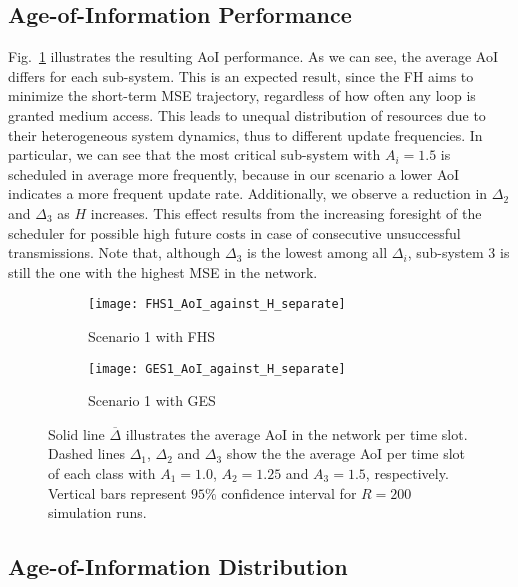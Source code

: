 \subsection{Age-of-Information Performance}

Fig.~\ref{fig:AoIseperate} illustrates the resulting AoI performance. As we can
see, the average AoI differs for each sub-system. This is an expected result,
since the FH aims to minimize the short-term MSE trajectory, regardless of how
often any loop is granted medium access. This leads to unequal distribution of
resources due to their heterogeneous system dynamics, thus to different update
frequencies. In particular, we can see that the most critical sub-system with
$A_i = 1.5$ is scheduled in average more frequently, because in our scenario a
lower AoI indicates a more frequent update rate. Additionally, we observe a
reduction in $\Delta_2$ and $\Delta_3$ as $H$ increases. This effect results
from the increasing foresight of the scheduler for possible high future costs in
case of consecutive unsuccessful transmissions. Note that, although $\Delta_3$
is the lowest among all $\Delta_i$, sub-system $3$ is still the one with the
highest MSE in the network.

\begin{figure}[htbp]
  \centering
  \begin{subfigure}[b]{0.49\textwidth}
      \centering
      \texttt{[image: FHS1\_AoI\_against\_H\_separate]}
      \caption{Scenario 1 with FHS}
  \end{subfigure}
  \hfill
  \begin{subfigure}[b]{0.49\textwidth}
      \centering
      \texttt{[image: GES1\_AoI\_against\_H\_separate]}
      \caption{Scenario 1 with GES}
  \end{subfigure}
     \caption[Scenario 1: Average AoI vs. finite horizon $H$ for Scenario
     1]{Solid line $\overline{\Delta}$ illustrates the average AoI in the
     network per time slot. Dashed lines $\Delta_1$, $\Delta_2$ and $\Delta_3$
     show the the average AoI per time slot of each class with $A_1 = 1.0$,
     $A_2=1.25$ and $A_3=1.5$, respectively. Vertical bars represent $95\%$
     confidence interval for $R=200$ simulation runs.}
     \label{fig:AoIseperate}
\end{figure}

\subsection{Age-of-Information Distribution}

